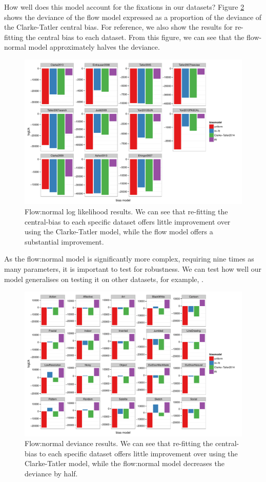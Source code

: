 \documentclass[a4paper, onecolumn, oneside, 11pt]{article}
\begin{document}
How well does this model account for the fixations in our datasets? Figure \ref{fig:nFlowDevAll} shows the deviance of the flow model expressed as a proportion of the deviance of the Clarke-Tatler central bias. For reference, we also show the results for re-fitting the central bias to each dataset. From this figure, we can see that the flow-normal model approximately halves the deviance. 

\begin{figure}
\centering
 \includegraphics[width=12cm]{../scripts/flow/figs/llh_ALL.pdf}
\caption{Flow:normal log likelihood results. We can see that re-fitting the central-bias to each specific dataset offers little improvement over using the Clarke-Tatler model, while the flow model offers a substantial improvement.}
\label{fig:nFlowDevAll}
\end{figure}

As the flow:normal model is significantly more complex, requiring nine times as many parameters, it is important to test for robustness. We can test how well our model generalises on testing it on other datasets, for example, \cite{borji2015}. 


\begin{figure}
\centering
 \includegraphics[width=12cm]{../scripts/flow/figs/llh_Borji.pdf}
\caption{Flow:normal deviance results. We can see that re-fitting the central-bias to each specific dataset offers little improvement over using the Clarke-Tatler model, while the flow:normal model decreases the deviance by half.}
\label{fig:nFlowDevAll}
\end{figure}
\end{document}
